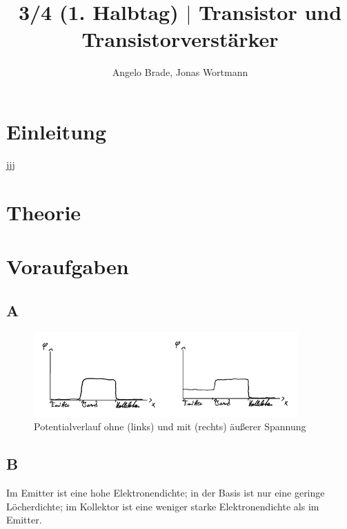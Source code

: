\documentclass[a4paper,12pt]{article}
\numberwithin{equation}{section}
\begin{document}

\title{3/4 (1. Halbtag) $|$ Transistor und Transistorverstärker}
\author{Angelo Brade, Jonas Wortmann}
\maketitle
{}


\newpage


\fancyhead[L]{\thepage}
\fancyfoot[C]{}

\tableofcontents


\newpage


\fancyhead[R]{\leftmark}

\section{Einleitung}
jjj

\clearpage
\section{Theorie}

\clearpage
\section{Voraufgaben}
\subsection{A}
\begin{figure}[h]
        \centering
        \includegraphics[width=0.9\textwidth]{A_crop.pdf}
        \caption[Potentialverlauf ohne und mit äußerer Spannung]{Potentialverlauf ohne (links) und mit (rechts) äußerer Spannung}
\end{figure}

\subsection{B}
Im Emitter ist eine hohe Elektronendichte; in der Basis ist nur eine geringe Löcherdichte; im Kollektor ist eine weniger starke Elektronendichte als im Emitter.
\end{document}
